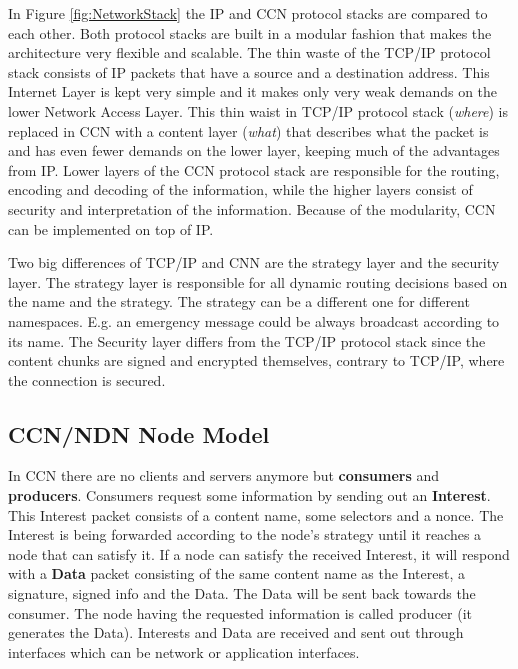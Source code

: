 \newpage

In Figure \ref{fig:NetworkStack} the IP and CCN protocol stacks are compared to each other. Both protocol stacks are built in a modular fashion that makes the architecture very flexible and scalable. The thin waste of the TCP/IP protocol stack consists of IP packets that have a source and a destination address. This Internet Layer is kept very simple and it makes only very weak demands on the lower Network Access Layer. This thin waist in TCP/IP protocol stack (\emph{where}) is replaced in CCN with a content layer (\emph{what}) that describes what the packet is and has even fewer demands on the lower layer, keeping much of the advantages from IP. Lower layers of the CCN protocol stack are responsible for the routing, encoding and decoding of the information, while the higher layers consist of security and interpretation of the information. Because of the modularity, CCN can be implemented on top of IP.

\vspace{5mm} %

Two big differences of TCP/IP and CNN are the strategy layer and the security layer. The strategy layer is responsible for all dynamic routing decisions based on the name and the strategy. The strategy can be a different one for different namespaces. E.g. an emergency message could be always broadcast according to its name. The Security layer differs from the TCP/IP protocol stack since the content chunks are signed and encrypted themselves, contrary to TCP/IP, where the connection is secured.

\subsection{CCN/NDN Node Model}

In CCN there are no clients and servers anymore but \textbf{consumers} and \textbf{producers}. Consumers request some information by sending out an \textbf{Interest}. This Interest packet consists of a content name, some selectors and a nonce. The Interest is being forwarded according to the node's strategy until it reaches a node that can satisfy it. If a node can satisfy the received Interest, it will respond with a \textbf{Data} packet consisting of the same content name as the Interest, a signature, signed info and the Data. The Data will be sent back towards the consumer. The node having the requested information is called producer (it generates the Data). Interests and Data are received and sent out through interfaces which can be network or application interfaces.

